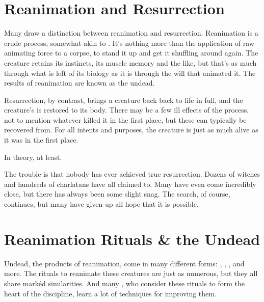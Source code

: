 
\section{Reanimation and Resurrection}

Many  draw a distinction between reanimation and resurrection.
Reanimation is a crude process, somewhat akin to .
It's nothing more than the application of raw animating force to a corpse, to stand it up and get it shuffling around again.
The creature retains its instincts, its muscle memory and the like, but that's as much through what is left of its biology as it is through the will that animated it.
The results of reanimation are known as the undead.

Resurrection, by contrast, brings a creature back back to life in full, and the creature's {\soul} is restored to its body.
There may be a few ill effects of the process, not to mention whatever killed it in the first place, but these can typically be recovered from.
For all intents and purposes, the creature is just as much alive as it was in the first place.

In theory, at least.

The trouble is that nobody has ever achieved true resurrection.
Dozens of witches and hundreds of charlatans have all claimed to.
Many have even come incredibly close, but there has always been some slight snag.
The search, of course, continues, but many have given up all hope that it is possible.

\section{Reanimation Rituals \& the Undead}

Undead, the products of reanimation, come in many different forms: , , , and more.
The rituals to reanimate these creatures are just as numerous, but they all share mark{\'e}d similarities.
And many , who consider these rituals to form the heart of the discipline, learn a lot of techniques for improving them.

